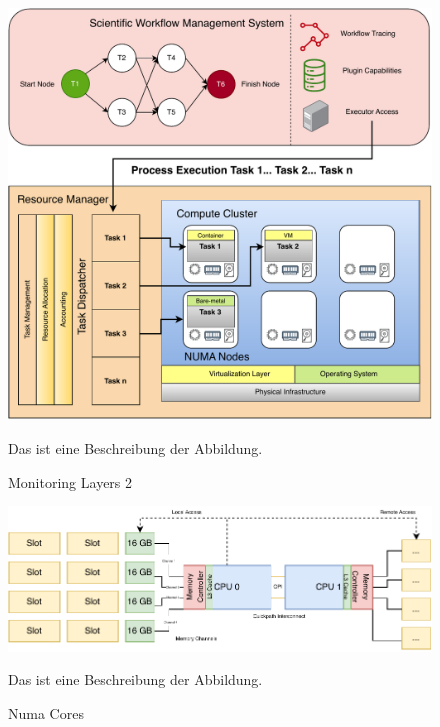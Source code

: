 \begin{figure}[H]
    \centering
    \includegraphics[scale=0.5]{fig/02/02-monitoring-layers2.pdf}
    \caption{Monitoring Layers 2}
    \label{fig:02-monitoring-layers2}
    \tiny
    Das ist eine Beschreibung der Abbildung.
\end{figure}

\begin{figure}[H]
    \centering
    \includegraphics[scale=0.9]{fig/02/02-numa-cores.pdf}
    \caption{Numa Cores}
    \label{fig:02-numa-cores}
    \tiny
    Das ist eine Beschreibung der Abbildung.
\end{figure}

